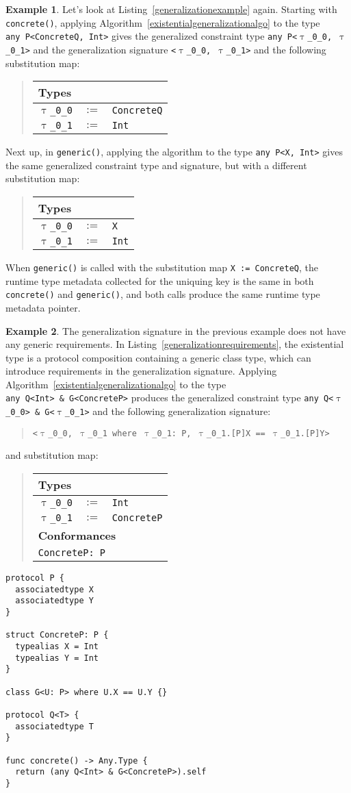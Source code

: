 \documentclass[a4paper,headsepline,bibliography=totoc,toc=flat,fleqn,twoside=semi]{scrbook}
\theoremstyle{definition}
\theoremstyle{definition}
\newtheorem{example}{Example}[chapter]
\theoremstyle{definition}
\newcommand{\ttgp}[2]{\texttt{$\uptau$\_#1\_#2}}
\newcommand{\SubMap}[1]{\begin{tabular}{|lll|}
\hline
\multicolumn{3}{|l|}{\textbf{Types}}\\
\hline
#1\\
\hline
\end{tabular}}
\newcommand{\SubMapC}[2]{\begin{tabular}{|lll|}
\hline
\multicolumn{3}{|l|}{\textbf{Types}}\\
\hline
#1\\
\hline
\hline
\multicolumn{3}{|l|}{\textbf{Conformances}}\\
\hline
#2\\
\hline
\end{tabular}}
\newcommand{\SubType}[2]{\texttt{#1}&$:=$&\texttt{#2}}
\newcommand{\SubConf}[1]{\multicolumn{3}{|l|}{\texttt{#1}}}
\begin{document}
\begin{example} Let's look at Listing~\ref{generalizationexample} again. Starting with \texttt{concrete()}, applying Algorithm~\ref{existentialgeneralizationalgo} to the type \texttt{any~P<ConcreteQ,~Int>} gives the generalized constraint type \texttt{any~P<\ttgp{0}{0},~\ttgp{0}{1}>} and the generalization signature \texttt{<\ttgp{0}{0}, \ttgp{0}{1}>} and the following substitution map:
\begin{quote}
\SubMap{
\SubType{\ttgp{0}{0}}{ConcreteQ}\\
\SubType{\ttgp{0}{1}}{Int}
}
\end{quote}
Next up, in \texttt{generic()}, applying the algorithm to the type \texttt{any~P<X,~Int>} gives the same generalized constraint type and signature, but with a different substitution map:
\begin{quote}
\SubMap{
\SubType{\ttgp{0}{0}}{X}\\
\SubType{\ttgp{0}{1}}{Int}
}
\end{quote}
When \texttt{generic()} is called with the substitution map \texttt{X := ConcreteQ}, the runtime type metadata collected for the uniquing key is the same in both \texttt{concrete()} and \texttt{generic()}, and both calls produce the same runtime type metadata pointer.
\end{example}

\begin{example}
The generalization signature in the previous example does not have any generic requirements. In Listing~\ref{generalizationrequirements}, the existential type is a protocol composition containing a generic class type, which can introduce requirements in the generalization signature. Applying Algorithm~\ref{existentialgeneralizationalgo} to the type \texttt{any~Q<Int>~\&~G<ConcreteP>} produces the generalized constraint type \texttt{any~Q<\ttgp{0}{0}>~\&~G<\ttgp{0}{1}>} and the following generalization signature:
\begin{quote}
\texttt{<\ttgp{0}{0}, \ttgp{0}{1} where \ttgp{0}{1}:\ P, \ttgp{0}{1}.[P]X == \ttgp{0}{1}.[P]Y>}
\end{quote}
and substitution map:
\begin{quote}
\SubMapC{
\SubType{\ttgp{0}{0}}{Int}\\
\SubType{\ttgp{0}{1}}{ConcreteP}
}{
\SubConf{ConcreteP:\ P}
}
\end{quote}
\end{example}
\begin{listing}\label{generalizationrequirements}
\begin{Verbatim}
protocol P {
  associatedtype X
  associatedtype Y
}

struct ConcreteP: P {
  typealias X = Int
  typealias Y = Int
}

class G<U: P> where U.X == U.Y {}

protocol Q<T> {
  associatedtype T
}

func concrete() -> Any.Type {
  return (any Q<Int> & G<ConcreteP>).self
}
\end{Verbatim}
\end{listing}
\fi
\end{document}
